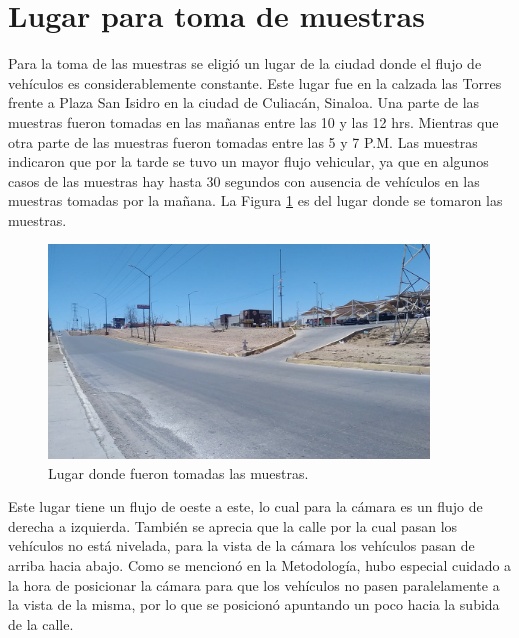 \section{Lugar para toma de muestras}

Para la toma de las muestras se eligió un lugar de la ciudad donde el flujo de vehículos es considerablemente constante. Este lugar fue en la calzada las Torres frente a Plaza San Isidro en la ciudad de Culiacán, Sinaloa. Una parte de las muestras fueron tomadas en las mañanas entre las 10 y las 12 hrs. Mientras que otra parte de las muestras fueron tomadas entre las 5 y 7 P.M. Las muestras indicaron que por la tarde se tuvo un mayor flujo vehicular, ya que en algunos casos de las muestras hay hasta 30 segundos con ausencia de vehículos en las muestras tomadas por la mañana. La Figura \ref{fig:LugarMuestras} es del lugar donde se tomaron las muestras.

\begin{figure}[H]
    \centering
    \includegraphics[width=0.9\textwidth]{Resultados/imgs/LugarMuestras.jpg}
    \caption{Lugar donde fueron tomadas las muestras.}
    \label{fig:LugarMuestras}
\end{figure}

Este lugar tiene un flujo de oeste a este, lo cual para la cámara es un flujo de derecha a izquierda. También se aprecia que la calle por la cual pasan los vehículos no está nivelada, para la vista de la cámara los vehículos pasan de arriba hacia abajo. Como se mencionó en la Metodología, hubo especial cuidado a la hora de posicionar la cámara para que los vehículos no pasen paralelamente a la vista de la misma, por lo que se posicionó apuntando un poco hacia la subida de la calle.
